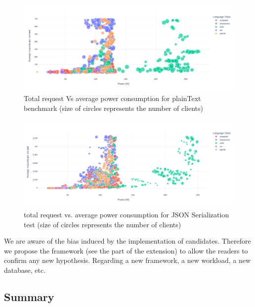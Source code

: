 \begin{figure}[hbt]
    \centering
    \includegraphics[width=\textwidth,height=\textheight,keepaspectratio]{imgs/power_requests_plaintext}
    \caption{Total request Vs average power consumption for plainText benchmark (size of circles represents the number of clients)}
    \label{fig:power_requests_plaintext}
\end{figure}

\begin{figure}[hbt]
    \centering
    \includegraphics[width=\textwidth,height=\textheight,keepaspectratio]{imgs/power_requests_json}
    \caption{total request vs. average power consumption for JSON Serialization test (size of circles represents the number of clients)}
    \label{fig:power_requests_json}
\end{figure}

We are aware of the bias induced by the implementation of candidates. Therefore we propose the framework (see the part of the extension) to allow the readers to confirm any new hypothesis.
Regarding a new framework, a new workload, a new database, etc.

\subsection{Summary}

